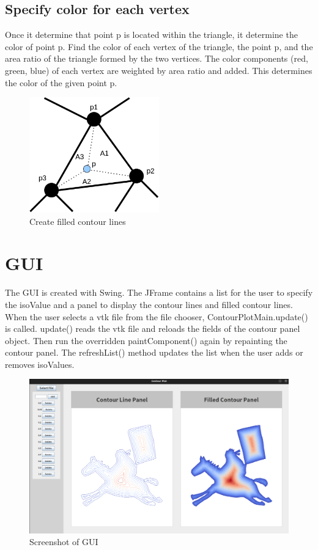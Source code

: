 \documentclass[12pt]{article}
\begin{document}
\subsection{Specify color for each vertex}
Once it determine that point p is located within the triangle, it determine the color of point p. Find the color of each vertex of the triangle, the point p, and the area ratio of the triangle formed by the two vertices. The color components (red, green, blue) of each vertex are weighted by area ratio and added. This determines the color of the given point p.
\begin{figure}[h]
\centering
\includegraphics[width=0.5\textwidth]{filledcontourline.png}
\caption{Create filled contour lines}
\label{fig:my_label}
\end{figure}

\section{GUI}
The GUI is created with Swing. The JFrame contains a list for the user to specify the isoValue and a panel to display the contour lines and filled contour lines. When the user selects a vtk file from the file chooser, ContourPlotMain.update() is called. update() reads the vtk file and reloads the fields of the contour panel object. Then run the overridden paintComponent() again by repainting the contour panel. The refreshList() method updates the list when the user adds or removes isoValues. 
\begin{figure}[h]
\centering
\includegraphics[width=1.0\textwidth]{gui.png}
\caption{Screenshot of GUI}
\label{fig:my_label}
\end{figure}
\end{document}
